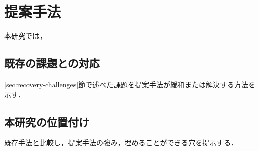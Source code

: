 \chapter{提案手法}
本研究では，

\section{既存の課題との対応}
\ref{sec:recovery-challenges}節で述べた課題を提案手法が緩和または解決する方法を示す．
\section{本研究の位置付け}
既存手法と比較し，提案手法の強み，埋めることができる穴を提示する．

